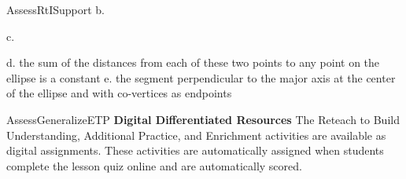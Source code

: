\documentclass{article}
\newenvironment{te-addendum}[2]{}{}     %
\newcommand{\placeholder}[2]{}          %
\newcommand{\te}[1]{}                   %
\begin{document}
\begin{te-addendum}{Assess}{RtISupport}
b.
\placeholder{diagram}{Option b: plain horizontal black ellipse, no axes or labels.}
c.
\placeholder{graph}{Co-vertices option c: gray grid spacing 2, black x/y axes arrows O origin, labels +/-4. Horizontal ellipse centered at origin with horizontal extrema about +/-9; vertical co-vertices labeled (0,5),(0,-5).}
d. the sum of the distances from each of these two points to any point on the ellipse is a constant
e. the segment perpendicular to the major axis at the center of the ellipse and with co-vertices as endpoints
\te{The printed vocabulary chart begins its numbered blanks at 2.}
\end{te-addendum}
\begin{te-addendum}{Assess}{GeneralizeETP}
\textbf{Digital Differentiated Resources}
The Reteach to Build Understanding, Additional Practice, and Enrichment activities are available as digital assignments. These activities are automatically assigned when students complete the lesson quiz online and are automatically scored.
\placeholder{illustration}{Black tablet showing MathXL exercise: Solve the system of equations by graphing, y=3x+4 and y=-2x+4. Use the graphing tool to graph the system; Click to enlarge graph. Blank unit grid [-10,10] both axes with black x/y arrows, labels every 2. Question Help menu: Help Me Solve This, View an Example, Video, Textbook, Glossary, Math Tools, Print. Bottom: Click the graph, choose a tool in the palette and follow the instructions to create your graph; 1 part remaining, Clear All, Check Answer, Review progress, Question 5 of 14, Go, Back, Next.}
\end{te-addendum}
\end{document}
